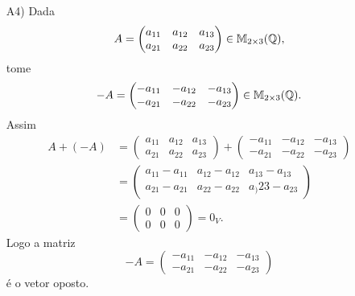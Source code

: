 \begin{exemplo}
\begin{enumerate}[label={\arabic*})]
\begin{solucao}
\begin{itemize}
				      \item[A4)] Dada
					      \[
						      A = \begin{pmatrix} a_{11} & a_{12} & a_{13}\\a_{21} & a_{22} & a_{23}\end{pmatrix} \in \mathbb{M}_{2 \times 3}(\mathbb{Q}),
					      \]
					      tome
					      \[
						      -A = \begin{pmatrix} -a_{11} & -a_{12} & -a_{13}\\-a_{21} & -a_{22} & -a_{23}\end{pmatrix} \in \mathbb{M}_{2 \times 3}(\mathbb{Q}).
					      \]
					      Assim
					      \begin{align*}
						      A + (-A) & = \begin{pmatrix} a_{11} & a_{12} & a_{13}\\a_{21} & a_{22} & a_{23}\end{pmatrix} +
						      \begin{pmatrix} -a_{11} & -a_{12} & -a_{13}\\-a_{21} & -a_{22} & -a_{23}\end{pmatrix}
						      \\ &= \begin{pmatrix} a_{11} - a_{11} & a_{12} - a_{12} & a_{13} - a_{13}\\a_{21} - a_{21} & a_{22} - a_{22} & a_){23} - a_{23}\end{pmatrix}
						      \\ &= \begin{pmatrix}0 & 0 & 0\\0 & 0 & 0\end{pmatrix} = 0_V.
					      \end{align*}
					      Logo a matriz
					      \[
						      -A = \begin{pmatrix} -a_{11} & -a_{12} & -a_{13}\\-a_{21} & -a_{22} & -a_{23}\end{pmatrix}
					      \]
					      é o vetor oposto.


\end{itemize}
\end{solucao}
\end{enumerate}
\end{exemplo}
